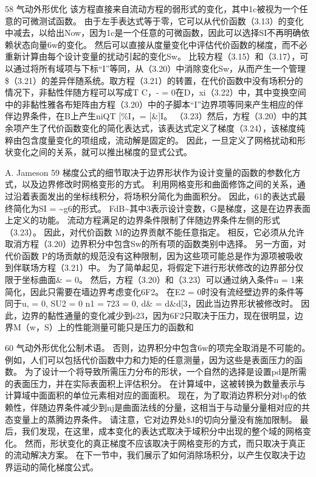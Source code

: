 \documentclass[UTF8,11pt,a4paper,openany,fontset=fandol]{ctexbook}
\begin{document}
58 气动外形优化 该方程直接来自流动方程的弱形式的变化，其中1c被视为一个任意的可微测试函数。 由于左手表达式等于零，它可以从代价函数（3.13）的变化中减去，以给出Now，因为1c是一个任意的可微函数，因此可以选择SI不再明确依赖状态向量6w的变化。 然后可以直接从度量变化中评估代价函数的梯度，而不必重新计算由每个设计变量的扰动引起的变化Sw。 比较方程（3.15）和（3.17），可以通过将所有域项与下标“I”等同，从（3.20）中消除变化Sw，从而产生一个管理\$（3.21）的差异伴随系统。取方程（3.21）的转置，在代价函数中没有场积分的情况下，非黏性伴随方程可以写成T C，- = 0在D，xi（3.22）中，其中变换空间中的非黏性雅各布矩阵由方程（3.20）中的子脚本“I”边界项等同来产生相应的伴伴边界条件，在B上产生niQT [\%I，= [\&]I。 （3.23）然后，方程（3.20）中的其余项产生了代价函数变化的简化表达式，该表达式定义了梯度（3.24），该梯度纯粹由包含度量变化的项组成，流动解是固定的。 因此，一旦定义了网格扰动和形状变化之间的关系，就可以推出梯度的显式公式。

A. Jameson 59 梯度公式的细节取决于边界形状作为设计变量的函数的参数化方式，以及边界修改时网格变形的方式。 利用网格变形和曲面修饰之间的关系，通过沿着表面发出的坐标线积分，将场积分简化为曲面积分。 因此，61的表达式最终简化为SI = \textasciitilde{}g6的形式。 FdB\textasciitilde{}其中3表示设计变数，G是梯度，这是在边界表面上定义的功能。 流动方程满足的边界条件限制了伴随边界条件左侧的形式（3.23）。 因此，对代价函数 M的边界贡献不能任意指定。 相反，它必须从允许取消方程（3.20）边界积分中包含Sw的所有项的函数类别中选择。 另一方面，对代价函数 P的场贡献的规范没有这种限制，因为这些项可能总是作为源项被吸收到伴联场方程（3.21）中。 为了简单起见，将假定下进行形状修改的边界部分仅限于坐标曲面\& = 0。 然后，方程（3.20）和（3.23）可以通过纳入条件n = 1来简化，因此只需要在墙边界考虑变化6F2。 在E2 = 0时没有流经壁边界的条件等同于u, = 0, SU2 = 0 n1 = 723 = 0, d\& = d\&d[3，因此当边界形状被修改时。 因此，边界的黏性通量的变化减少到s23，因为6F2只取决于压力，现在很明显，边界M（w，S）上的性能测量可能只是压力的函数和

60 气动外形优化公制术语。 否则，边界积分中包含6w的项完全取消是不可能的。 例如，人们可以包括代价函数中力和力矩的任意测量，因为这些是表面压力的函数。 为了设计一个将导致所需压力分布的形状，一个自然的选择是设置pd是所需的表面压力，并在实际表面积上评估积分。 在计算域中，这被转换为数量表示与计算域中面面积的单位元素相对应的面面积。 现在，为了取消边界积分对bp的依赖性，伴随边界条件减少到nj是曲面法线的分量，这相当于与动量分量相对应的共态变量上的蒸腾边界条件。 请注意，它对边界处\$J的切向分量没有施加限制。 最后，我们发现，在这里，成本变化的表达式取决于域积分中出现的整个域的网格变化。 然而，形状变化的真正梯度不应该取决于网格变形的方式，而只取决于真正的流动解决方案。 在下一节中，我们展示了如何消除场积分，以产生仅取决于边界运动的简化梯度公式。
\end{document}

